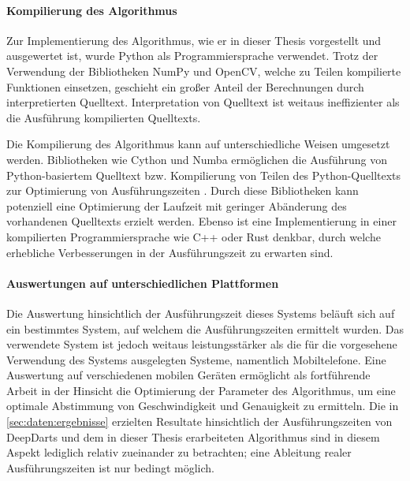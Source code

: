 
\paragraph{Kompilierung des Algorithmus}

Zur Implementierung des Algorithmus, wie er in dieser Thesis vorgestellt und ausgewertet ist, wurde Python als Programmiersprache verwendet. Trotz der Verwendung der Bibliotheken NumPy und OpenCV, welche zu Teilen kompilierte Funktionen einsetzen, geschieht ein großer Anteil der Berechnungen durch interpretierten Quelltext. Interpretation von Quelltext ist weitaus ineffizienter als die Ausführung kompilierten Quelltexts.

Die Kompilierung des Algorithmus kann auf unterschiedliche Weisen umgesetzt werden. Bibliotheken wie Cython und Numba ermöglichen die Ausführung von Python-basiertem Quelltext bzw. Kompilierung von Teilen des Python-Quelltexts zur Optimierung von Ausführungszeiten \cite{cython,numba}. Durch diese Bibliotheken kann potenziell eine Optimierung der Laufzeit mit geringer Abänderung des vorhandenen Quelltexts erzielt werden. Ebenso ist eine Implementierung in einer kompilierten Programmiersprache wie C++ oder Rust denkbar, durch welche erhebliche Verbesserungen in der Ausführungszeit zu erwarten sind.


\paragraph{Auswertungen auf unterschiedlichen Plattformen}

Die Auswertung hinsichtlich der Ausführungszeit dieses Systems beläuft sich auf ein bestimmtes System, auf welchem die Ausführungszeiten ermittelt wurden. Das verwendete System ist jedoch weitaus leistungsstärker als die für die vorgesehene Verwendung des Systems ausgelegten Systeme, namentlich Mobiltelefone. Eine Auswertung auf verschiedenen mobilen Geräten ermöglicht als fortführende Arbeit in der Hinsicht die Optimierung der Parameter des Algorithmus, um eine optimale Abstimmung von Geschwindigkeit und Genauigkeit zu ermitteln. Die in \autoref{sec:daten:ergebnisse} erzielten Resultate hinsichtlich der Ausführungszeiten von DeepDarts und dem in dieser Thesis erarbeiteten Algorithmus sind in diesem Aspekt lediglich relativ zueinander zu betrachten; eine Ableitung realer Ausführungszeiten ist nur bedingt möglich.

